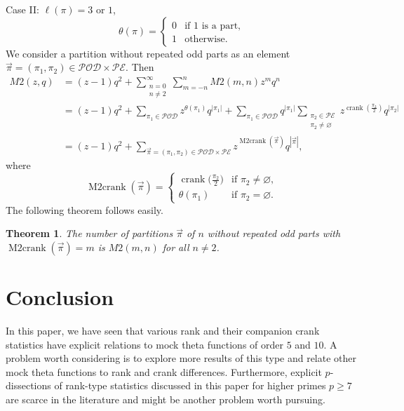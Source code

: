 \documentclass[10pt,a4paper]{amsart}
\numberwithin{equation}{section}
\newtheorem{Theorem}{Theorem}[section]
\newcommand\mylabel[1]{\label{#1}}
\begin{document}
Case II: $\ell(\pi) = 3$ or $1$,
\begin{equation*}%
\theta(\pi)=\begin{cases}
0 & \mbox{if $1$ is a part}, \\
1 & \mbox{otherwise.}
\end{cases}
\end{equation*}%
We consider a partition without repeated odd parts as an element
$\vec{\pi}=(\pi_1,\pi_2) \in \mathcal{POD} \times \mathcal{PE}$.
Then
\begin{align*}
M2(z,q)&{}=(z-1)q^2+\sum_{\substack{n=0\\ n\neq 2}}^\infty
\sum_{m=-n}^n  M2(m,n) z^m q^n
\\
&{}=(z-1)q^2+\sum\limits_{\pi_1 \in \mathcal{POD}}z^{\theta(\pi_1)}q^{|\pi_1|}+\sum\limits_{\pi_1 \in \mathcal{POD}}q^{|\pi_1|}\sum\limits_{\substack{\pi_2 \in \mathcal{PE}\\ \pi_2 \neq \varnothing}}z^{\operatorname{crank}(\frac{\pi_2}{2})}q^{|\pi_2|}
\\
&{}=(z-1)q^2+\sum\limits_{\vec{\pi} = (\pi_1,\pi_2) \in \mathcal{POD} \times \mathcal{PE}}z^{\operatorname{M2crank}(\vec{\pi})}q^{|\vec{\pi}|},
\end{align*}
where
\begin{equation*}%
\operatorname{M2crank}(\vec{\pi})=\begin{cases}
\operatorname{crank}\bigl(\frac{\pi_2}{2}\bigr) & \mbox{if $\pi_2 \neq \varnothing$},
\\
\theta(\pi_1) & \mbox{if $\pi_2 = \varnothing$.}
\end{cases}
\end{equation*}%
The following theorem follows easily.
\begin{Theorem}
The number of partitions $\vec{\pi}$ of $n$ without repeated odd parts with $\operatorname{M2crank}(\vec{\pi})=m$ is $M2(m,n)$ for all $n \neq 2$.
\end{Theorem}

\section{Conclusion}

In this paper, we have seen that various rank and their companion crank statistics have explicit relations to mock theta functions of order $5$ and $10$. A problem worth considering is to explore more results of this type and relate other mock theta functions to rank and crank differences. Furthermore, explicit $p$-dissections of rank-type statistics discussed in this paper for higher primes $p \geq 7$ are scarce in the literature and might be another problem worth pursuing.
\end{document}
